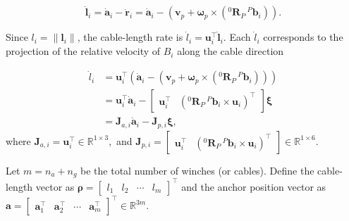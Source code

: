 \begin{equation}
    \dot{\mathbf{l}}_i = \dot{\mathbf{a}}_i - \dot{\mathbf{r}}_i = \dot{\mathbf{a}}_i - \left( \mathbf{v}_p + \boldsymbol{\omega}_p \times \left({}^0\mathbf{R}_P\,{}^P\mathbf{b}_i \right) \right).
\end{equation}

Since $l_i=\|\mathbf{l}_i\|$, the cable-length rate is $ \dot{l}_i = \mathbf{u}_i^\top \dot{\mathbf{l}}_i$. Each $\dot{l}_i$ corresponds to the projection of the relative velocity of $B_i$ along the cable direction

\begin{equation}
\begin{aligned}
    \dot{l}_i
    &= \mathbf{u}_i^\top \left( \dot{\mathbf{a}}_i - \left( \mathbf{v}_p + \boldsymbol{\omega}_p \times \left({}^0\mathbf{R}_P\,{}^P\mathbf{b}_i\right)\right)\right)
    \\
    &= \mathbf{u}_i^\top\dot{\mathbf{a}}_i -
    \begin{bmatrix}
        \mathbf{u}_i^\top & \left( {}^0\mathbf{R}_P\,{}^P\mathbf{b}_i \times \mathbf{u}_i\right)^\top
    \end{bmatrix}
    \boldsymbol{\xi}
    \\
    &= \mathbf{J}_{a,i}\dot{\mathbf{a}}_i - \mathbf{J}_{p,i}\boldsymbol{\xi},
\end{aligned}
\label{eq:cablelengthrate}
\end{equation}
where
$
    \mathbf{J}_{a,i}
    =
    \mathbf{u}_i^\top
    \in\mathbb{R}^{1\times3},
$
and
$
    \mathbf{J}_{p,i}
    =
    \begin{bmatrix}
        \mathbf{u}_i^\top &
        \left(
            {}^0\mathbf{R}_P\,{}^P\mathbf{b}_i
            \times
            \mathbf{u}_i
        \right)^\top
    \end{bmatrix}
    \in\mathbb{R}^{1\times6}.
$

Let $m = n_a + n_g$ be the total number of winches (or cables). Define the cable-length vector as $\boldsymbol{\rho} =
    \begin{bmatrix} 
        l_1 & l_2 & \cdots & l_m
    \end{bmatrix}^{\top}$ and the anchor position vector as $\mathbf{a}
    =
    \begin{bmatrix}
        \mathbf{a}_1^\top &
        \mathbf{a}_2^\top &
        \cdots &
        \mathbf{a}_m^\top
    \end{bmatrix}^{\top}
    \in\mathbb{R}^{3m}.$


